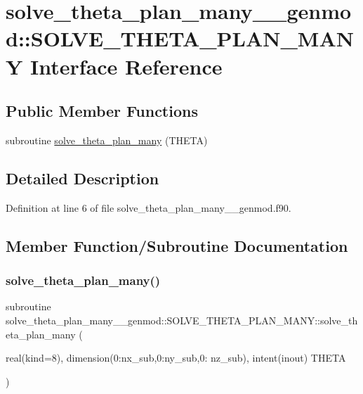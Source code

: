 \hypertarget{interfacesolve__theta__plan__many____genmod_1_1_s_o_l_v_e___t_h_e_t_a___p_l_a_n___m_a_n_y}{}\section{solve\+\_\+theta\+\_\+plan\+\_\+many\+\_\+\+\_\+genmod\+::S\+O\+L\+V\+E\+\_\+\+T\+H\+E\+T\+A\+\_\+\+P\+L\+A\+N\+\_\+\+M\+A\+NY Interface Reference}
\label{interfacesolve__theta__plan__many____genmod_1_1_s_o_l_v_e___t_h_e_t_a___p_l_a_n___m_a_n_y}
\subsection*{Public Member Functions}
\begin{DoxyCompactItemize}
\item 
subroutine \mbox{\hyperlink{interfacesolve__theta__plan__many____genmod_1_1_s_o_l_v_e___t_h_e_t_a___p_l_a_n___m_a_n_y_a30cf48bed3b002fb21208afa69fab9b7}{solve\+\_\+theta\+\_\+plan\+\_\+many}} (T\+H\+E\+TA)
\end{DoxyCompactItemize}


\subsection{Detailed Description}


Definition at line 6 of file solve\+\_\+theta\+\_\+plan\+\_\+many\+\_\+\+\_\+genmod.\+f90.



\subsection{Member Function/\+Subroutine Documentation}
\mbox{\label{interfacesolve__theta__plan__many____genmod_1_1_s_o_l_v_e___t_h_e_t_a___p_l_a_n___m_a_n_y_a30cf48bed3b002fb21208afa69fab9b7}} 
\subsubsection{\texorpdfstring{solve\_theta\_plan\_many()}{solve\_theta\_plan\_many()}}
{\footnotesize\ttfamily subroutine solve\+\_\+theta\+\_\+plan\+\_\+many\+\_\+\+\_\+genmod\+::\+S\+O\+L\+V\+E\+\_\+\+T\+H\+E\+T\+A\+\_\+\+P\+L\+A\+N\+\_\+\+M\+A\+N\+Y\+::solve\+\_\+theta\+\_\+plan\+\_\+many (\begin{DoxyParamCaption}\item[{real(kind=8), dimension(0\+:nx\+\_\+sub,0\+:ny\+\_\+sub,0\+: nz\+\_\+sub), intent(inout)}]{T\+H\+E\+TA }\end{DoxyParamCaption})}



